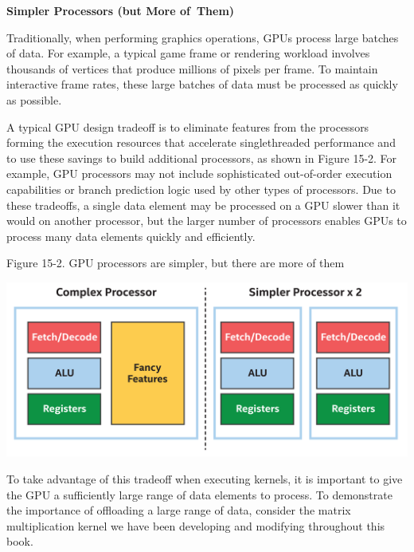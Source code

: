 \hspace*{\fill} \par %
\textbf{Simpler Processors (but More of Them)}

Traditionally, when performing graphics operations, GPUs process large batches of data. For example, a typical game frame or rendering workload involves thousands of vertices that produce millions of pixels per frame. To maintain interactive frame rates, these large batches of data must be processed as quickly as possible.\par

A typical GPU design tradeoff is to eliminate features from the processors forming the execution resources that accelerate singlethreaded performance and to use these savings to build additional processors, as shown in Figure 15-2. For example, GPU processors may not include sophisticated out-of-order execution capabilities or branch prediction logic used by other types of processors. Due to these tradeoffs, a single data element may be processed on a GPU slower than it would on another processor, but the larger number of processors enables GPUs to process many data elements quickly and efficiently.\par

\hspace*{\fill} \par %
Figure 15-2. GPU processors are simpler, but there are more of them
\begin{center}
	\includegraphics[width=1.0\textwidth]{content/chapter-15/images/3}
\end{center}

To take advantage of this tradeoff when executing kernels, it is important to give the GPU a sufficiently large range of data elements to process. To demonstrate the importance of offloading a large range of data, consider the matrix multiplication kernel we have been developing and modifying throughout this book.\par

